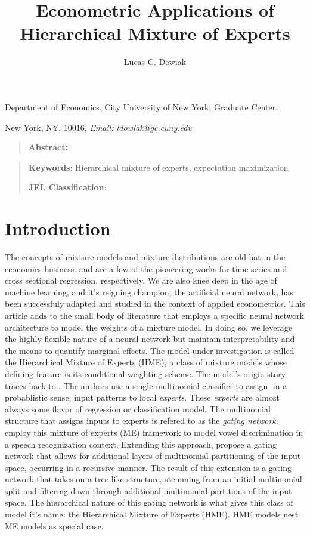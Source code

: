 \documentclass[12pt]{article}
\title{Econometric Applications of Hierarchical Mixture of Experts}
\author{Lucas C. Dowiak}
\begin{document}
 
\maketitle{}


Department of Economics, City University of New York\smallskip, Graduate
Center,

New York, NY, 10016, \textit{Email: ldowiak@gc.cuny.edu}

\qquad

\begin{quotation}
\textbf{Abstract:}
\end{quotation}

\vspace{1pt}

\begin{quotation}
\textbf{Keywords}: Hierarchical mixture of experts, expectation maximization

\textbf{JEL Classification}: 
\end{quotation}

\vspace{1pt}

\section{Introduction}

The concepts of mixture models and mixture distributions are old hat
in the economics business. \cite{Hamilton1989} and \cite{GoldfeldQuant1973}
are a few of the pioneering works for time series and cross sectional
regression, respectively. We are also knee deep in the age of machine
learning, and it's reigning champion, the artificial neural network, has
been successfuly adapted and studied in the context of applied econometrics.
This article adds to the small body of literature that employs a specific
neural network architecture to model the weights of a mixture model. In doing
so, we leverage the highly flexible nature of a neural network but maintain
interpretability and the means to quantify marginal effects.
The model under investigation is called the Hierarchical Mixture
of Experts (HME), a class of mixture models whose defining feature is 
its conditional weighting scheme. The model's origin story traces back to \cite{JJNH1991}.
The authors use a single multinomial classifier to assign, in a probablistic
sense, input patterns to local \textit{experts}. These \textit{experts} are
almost always some flavor of regression or classification model.
The multinomial structure that assigns inputs to experts is
refered to as the \textit{gating network}. \cite{JJNH1991} employ this
mixture of experts (ME) framework to model vowel discrimination in a speech
recognization context. Extending this approach, \cite{JordanJacobs1993}
propose a gating network that allows for additional layers of multinomial
partitioning of the input space, occurring in a recursive manner. The result
of this extension is a gating network that takes on a tree-like structure,
stemming from an initial multinomial split and filtering down through additional
multinomial partitions of the input space. The hierarchical nature of this
gating network is what gives this class of model it's name: the Hierarchical
Mixture of Experts (HME). HME models nest ME models as special case.
\end{document}
